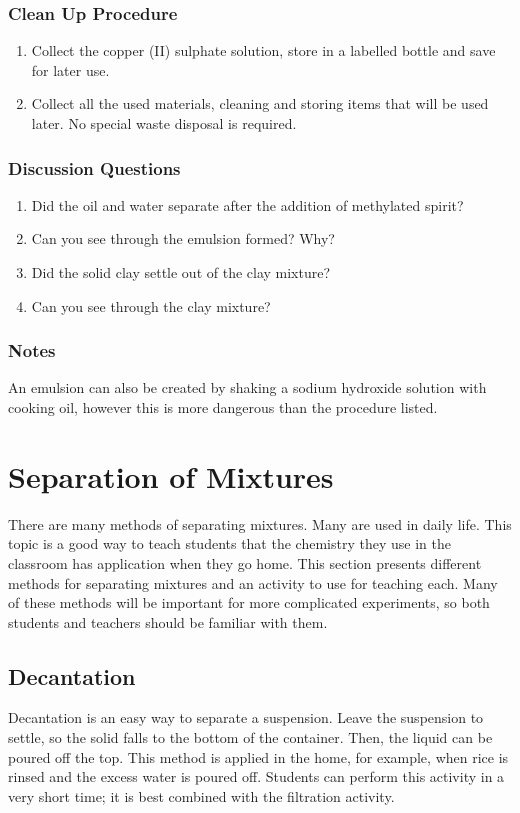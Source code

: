 \subsubsection*{Clean Up Procedure}
\begin{enumerate}
\item{Collect the copper (II) sulphate solution, store in a labelled bottle and save for later use.}
\item{Collect all the used materials, cleaning and storing items that will be used later. No special waste disposal is required.}
\end{enumerate}

\subsubsection*{Discussion Questions}
\begin{enumerate}
\item{Did the oil and water separate after the addition of methylated spirit?}
\item{Can you see through the emulsion formed? Why?}
\item{Did the solid clay settle out of the clay mixture?}
\item{Can you see through the clay mixture?}
\end{enumerate}

\subsubsection*{Notes}
An emulsion can also be created by shaking a sodium hydroxide solution with cooking oil, however this is more dangerous than the procedure listed.

\section{Separation of Mixtures}

There are many methods of separating mixtures. Many are used in daily life. This topic is a good way to teach students that the chemistry they use in the classroom has application when they go home. This section presents different methods for separating mixtures and an activity to use for teaching each. Many of these methods will be important for more complicated experiments, so both students and teachers should be familiar with them.

\subsection{Decantation}
Decantation is an easy way to separate a suspension. Leave the suspension to settle, so the solid falls to the bottom of the container. Then, the liquid can be poured off the top. This method is applied in the home, for example, when rice is rinsed and the excess water is poured off. Students can perform this activity in a very short time; it is best combined with the filtration activity.


